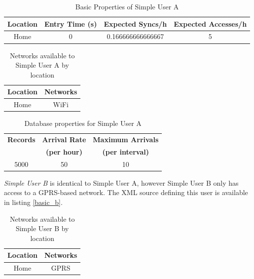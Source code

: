 \begin{table}[htdp]
\begin{center}
\begin{tabular}{|c|c|c|c|}
\hline
\textbf{Location} & \textbf{Entry Time (s)} & \textbf{Expected Syncs/h} & \textbf{Expected Accesses/h} \\
\hline
Home & 0 & 0.166666666666667 & 5 \\
\hline
\end{tabular}
\end{center}
\caption{Basic Properties of Simple User A}
\label{simple_a_properties}
\end{table}

\begin{table}[htdp]
\begin{center}
\begin{tabular}{|c|c|}
\hline
\textbf{Location} & \textbf{Networks} \\
\hline
Home & WiFi \\
\hline
\end{tabular}
\end{center}
\caption{Networks available to Simple User A by location}
\label{simple_a_networks}
\end{table}

\begin{table}[htdp]
\begin{center}
\begin{tabular}{|c|c|c|}
\hline
\textbf{Records} &\textbf{Arrival Rate} &\textbf{Maximum Arrivals} \\
 &\textbf{(per hour)} &\textbf{(per interval)} \\
\hline
5000 & 50 & 10 \\
\hline
\end{tabular}
\end{center}
\caption{Database properties for Simple User A}
\label{simple_a_database}
\end{table}

\emph{Simple User B} is identical to Simple User A, however Simple User B only has access to a GPRS-based network.  The XML source defining this user is available in listing \ref{basic_b}.

\begin{table}[htdp]
\begin{center}
\begin{tabular}{|c|c|}
\hline
\textbf{Location} & \textbf{Networks} \\
\hline
Home & GPRS \\
\hline
\end{tabular}
\end{center}
\caption{Networks available to Simple User B by location}
\label{simple_b_networks}
\end{table}

